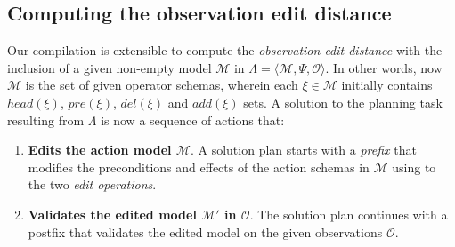 \documentclass{article}
\newcommand{\tup}[1]{{\langle #1 \rangle}}
\newcommand{\strips}{\textsc{Strips}}     %
\begin{document}




\subsection{Computing the observation edit distance}

Our compilation is extensible to compute the {\em observation edit distance} with the inclusion of a given non-empty model $\mathcal{M}$ in $\Lambda=\tup{\mathcal{M},\Psi,\mathcal{O}}$. In other words, now $\mathcal{M}$ is the set of given operator schemas, wherein each $\xi\in\mathcal{M}$ initially contains $head(\xi)$, $pre(\xi)$, $del(\xi)$ and $add(\xi)$ sets. A solution to the planning task resulting from $\Lambda$ is now a sequence of actions that:

\begin{enumerate}
\item {\bf Edits the action model $\mathcal{M}$}. A solution plan starts with a {\em prefix} that modifies the preconditions and effects of the action schemas in $\mathcal{M}$ using to the two {\em edit operations}.
\item {\bf Validates the edited model $\mathcal{M}'$ in $\mathcal{O}$}. The solution plan continues with a postfix that validates the edited model on the given observations $\mathcal{O}$.
\end{enumerate}
\end{document}
